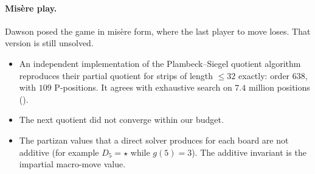 \paragraph{Misère play.} Dawson posed the game in misère form, where the last player to move loses. That
version is still unsolved.
\begin{itemize}
\item An independent implementation of the Plambeck--Siegel quotient algorithm \citep{PlambeckSiegel2008}
  reproduces their partial quotient for strips of length $\le32$ exactly: order $638$, with $109$ P-positions.
  It agrees with exhaustive search on $7.4$ million positions ().
\item The next quotient did not converge within our budget.
\item The partizan values that a direct solver produces for each board are not additive (for example $D_5=\star$
  while $g(5)=3$). The additive invariant is the impartial macro-move value.
\end{itemize}
